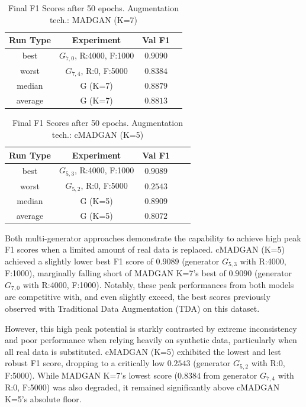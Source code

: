\begin{table}[H]
	\vspace{-1.5em}
	\centering
	\begin{tabular}{|c|c|c|c|}
		\hline
		Run Type & Experiment & Val F1 \\ \hline
		best & \(G_{7, 0}\), R:4000, F:1000 & $0.9090$\\ \hline
		worst & \(G_{7, 4}\), R:0, F:5000 & $0.8384$\\ \hline
		median & G (K=7) & $0.8879$\\ \hline
		average & G (K=7) & $0.8813$
		\\ \hline
	\end{tabular}
    \caption{Final F1 Scores after 50 epochs. Augmentation tech.: MADGAN (K=7)}
        \label{tab:res_replacement_fashion_cmadgan_vs_madgan__madgan}
\end{table}
\begin{table}[H]
	\centering
	\vspace{-1.5em}
	\begin{tabular}{|c|c|c|c|c|}
		\hline
		Run Type & Experiment & Val F1 \\ \hline
		best & \(G_{5, 3}\), R:4000, F:1000 & $0.9089$\\ \hline
		worst & \(G_{5, 2}\), R:0, F:5000 & $0.2543$\\ \hline
		median & G (K=5) & $0.8909$\\ \hline
		average & G (K=5) & $0.8072$
		\\ \hline
	\end{tabular}
    \caption{Final F1 Scores after 50 epochs. Augmentation tech.: cMADGAN (K=5)}
        \label{tab:res_replacement_fashion_cmadgan_vs_madgan__cmadgan}
\end{table}

Both multi-generator approaches demonstrate the capability to achieve high peak F1 scores when a limited amount of real data is replaced. cMADGAN (K=5) achieved a slightly lower best F1 score of $0.9089$ (generator \(G_{5,3}\) with R:4000, F:1000), marginally falling short of MADGAN K=7's best of $0.9090$ (generator \(G_{7,0}\) with R:4000, F:1000). Notably, these peak performances from both models are competitive with, and even slightly exceed, the best scores previously observed with Traditional Data Augmentation (TDA) on this dataset.

However, this high peak potential is starkly contrasted by extreme inconsistency and poor performance when relying heavily on synthetic data, particularly when all real data is substituted. cMADGAN (K=5) exhibited the lowest and lest robust F1 score, dropping to a critically low $0.2543$ (generator \(G_{5,2}\) with R:0, F:5000). While MADGAN K=7's lowest score ($0.8384$ from generator \(G_{7,4}\) with R:0, F:5000) was also degraded, it remained significantly above cMADGAN K=5's absolute floor.


